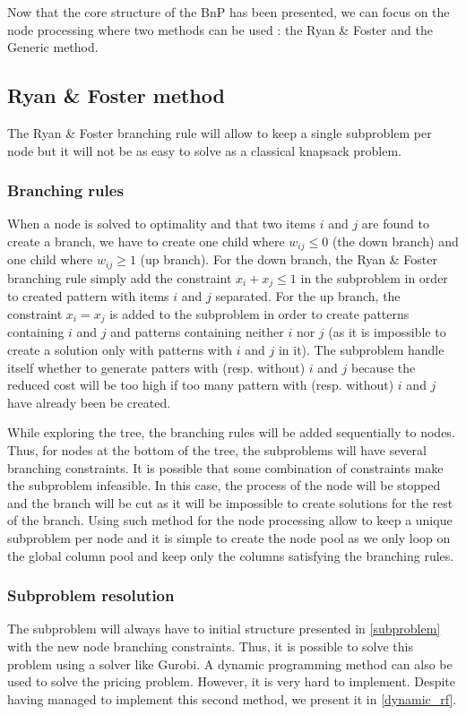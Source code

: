Now that the core structure of the BnP has been presented, we can focus on the node processing where two methods can be used : the Ryan \& Foster and the Generic method.

\subsection{Ryan \& Foster method}
\label{ryan-foster}

The Ryan \& Foster branching rule will allow to keep a single subproblem per node but it will not be as easy to solve as a classical knapsack problem. 

\subsubsection{Branching rules}

When a node is solved to optimality and that two items $i$ and $j$ are found to create a branch, we have to create one child where $w_{ij} \leq 0$ (the down branch) and one child where $w_{ij} \geq 1$ (up branch). For the down branch, the Ryan \& Foster branching rule simply add the constraint $x_i + x_j \leq 1$ in the subproblem in order to created pattern with items $i$ and $j$ separated. For the up branch, the constraint $x_i = x_j$ is added to the subproblem in order to create patterns containing $i$ and $j$ and patterns containing neither $i$ nor $j$ (as it is impossible to create a solution only with patterns with $i$ and $j$ in it). The subproblem handle itself whether to generate patters with (resp. without) $i$ and $j$ because the reduced cost will be too high if too many pattern with (resp. without) $i$ and $j$ have already been be created.

While exploring the tree, the branching rules will be added sequentially to nodes. Thus, for nodes at the bottom of the tree, the subproblems will have several branching constraints. It is possible that some combination of constraints make the subproblem infeasible. In this case, the process of the node will be stopped and the branch will be cut as it will be impossible to create solutions for the rest of the branch. Using such method for the node processing allow to keep a unique subproblem per node and it is simple to create the node pool as we only loop on the global column pool and keep only the columns satisfying the branching rules.

\subsubsection{Subproblem resolution}

The subproblem will always have to initial structure presented in \ref{subproblem} with the new node branching constraints. Thus, it is possible to solve this problem using a solver like Gurobi. A dynamic programming method can also be used to solve the pricing problem. However, it is very hard to implement. Despite having managed to implement this second method, we present it in \ref{dynamic_rf}. 